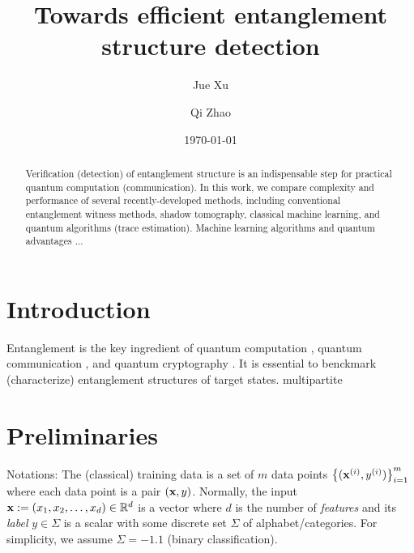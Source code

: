 \documentclass[
10pt,
aps,
pra,
linenumbers,
floatfix,
]{revtex4-2}
\theoremstyle{plain}
\theoremstyle{definition}
\begin{document}
\title{Towards efficient entanglement structure detection}
\author{Jue Xu}
\author{Qi Zhao}
\date{\today}
\begin{abstract}
	Verification (detection) of entanglement structure is an indispensable step for practical quantum computation (communication).
	In this work, we compare complexity and performance of several recently-developed methods, including conventional entanglement witness methods, shadow tomography, classical machine learning, and quantum algorithms (trace estimation).
	Machine learning algorithms and quantum advantages ...
\end{abstract}

\maketitle
 \tableofcontents

\section{Introduction}
Entanglement \cite{horodeckiQuantumEntanglement2009} is the key ingredient of quantum computation \cite{}, quantum communication \cite{}, and quantum cryptography \cite{}.
It is essential to benckmark (characterize) entanglement structures of target states.
multipartite

\section{Preliminaries}
Notations:
The (classical) training data is a set of $m$ data points $\qty{(\vb{x}^{(i)}, y^{(i)})}^{m}_{i=1}$ 
where each data point is a pair $(\vb{x},y)$.
Normally, the input $\vb{x}:= (x_1,x_2,\dots,x_d) \in \mathbb{R}^d$  is a vector where $d$ is the number of \emph{features}
and its \emph{label} $y\in\Sigma$ is a scalar with some discrete set $\Sigma$ of alphabet/categories. 
For simplicity, we assume $\Sigma=\qty{-1,1}$ (binary classification).
\end{document}
